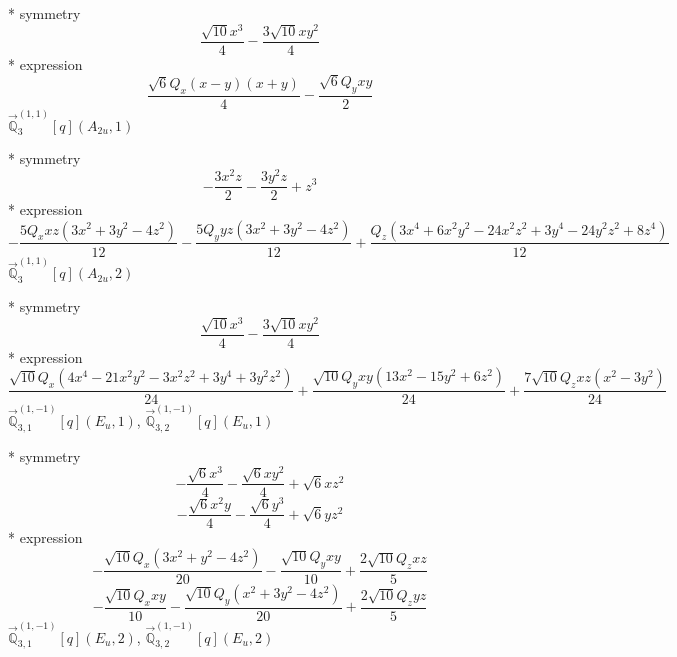 \documentclass[fleqn,8pt]{jsarticle}
\begin{document}
\noindent\quad ** symmetry
\begin{dmath*}
\frac{\sqrt{10} x^{3}}{4} - \frac{3 \sqrt{10} x y^{2}}{4}
\end{dmath*}
\noindent\quad ** expression
\begin{dmath*}
\frac{\sqrt{6} Q_{x} \left(x - y\right) \left(x + y\right)}{4} - \frac{\sqrt{6} Q_{y} x y}{2}
\end{dmath*}
\noindent\quad $\vec{\mathbb{Q}}_{3}^{(1,1)}[q](A_{2u},1)$

\noindent\quad ** symmetry
\begin{dmath*}
- \frac{3 x^{2} z}{2} - \frac{3 y^{2} z}{2} + z^{3}
\end{dmath*}
\noindent\quad ** expression
\begin{dmath*}
- \frac{5 Q_{x} x z \left(3 x^{2} + 3 y^{2} - 4 z^{2}\right)}{12} - \frac{5 Q_{y} y z \left(3 x^{2} + 3 y^{2} - 4 z^{2}\right)}{12} + \frac{Q_{z} \left(3 x^{4} + 6 x^{2} y^{2} - 24 x^{2} z^{2} + 3 y^{4} - 24 y^{2} z^{2} + 8 z^{4}\right)}{12}
\end{dmath*}
\noindent\quad $\vec{\mathbb{Q}}_{3}^{(1,1)}[q](A_{2u},2)$

\noindent\quad ** symmetry
\begin{dmath*}
\frac{\sqrt{10} x^{3}}{4} - \frac{3 \sqrt{10} x y^{2}}{4}
\end{dmath*}
\noindent\quad ** expression
\begin{dmath*}
\frac{\sqrt{10} Q_{x} \left(4 x^{4} - 21 x^{2} y^{2} - 3 x^{2} z^{2} + 3 y^{4} + 3 y^{2} z^{2}\right)}{24} + \frac{\sqrt{10} Q_{y} x y \left(13 x^{2} - 15 y^{2} + 6 z^{2}\right)}{24} + \frac{7 \sqrt{10} Q_{z} x z \left(x^{2} - 3 y^{2}\right)}{24}
\end{dmath*}
\noindent\quad $\vec{\mathbb{Q}}_{3,1}^{(1,-1)}[q](E_{u},1)$, $\vec{\mathbb{Q}}_{3,2}^{(1,-1)}[q](E_{u},1)$

\noindent\quad ** symmetry
\begin{dmath*}
- \frac{\sqrt{6} x^{3}}{4} - \frac{\sqrt{6} x y^{2}}{4} + \sqrt{6} x z^{2}
\end{dmath*}
\begin{dmath*}
- \frac{\sqrt{6} x^{2} y}{4} - \frac{\sqrt{6} y^{3}}{4} + \sqrt{6} y z^{2}
\end{dmath*}
\noindent\quad ** expression
\begin{dmath*}
- \frac{\sqrt{10} Q_{x} \left(3 x^{2} + y^{2} - 4 z^{2}\right)}{20} - \frac{\sqrt{10} Q_{y} x y}{10} + \frac{2 \sqrt{10} Q_{z} x z}{5}
\end{dmath*}
\begin{dmath*}
- \frac{\sqrt{10} Q_{x} x y}{10} - \frac{\sqrt{10} Q_{y} \left(x^{2} + 3 y^{2} - 4 z^{2}\right)}{20} + \frac{2 \sqrt{10} Q_{z} y z}{5}
\end{dmath*}
\noindent\quad $\vec{\mathbb{Q}}_{3,1}^{(1,-1)}[q](E_{u},2)$, $\vec{\mathbb{Q}}_{3,2}^{(1,-1)}[q](E_{u},2)$
\end{document}
